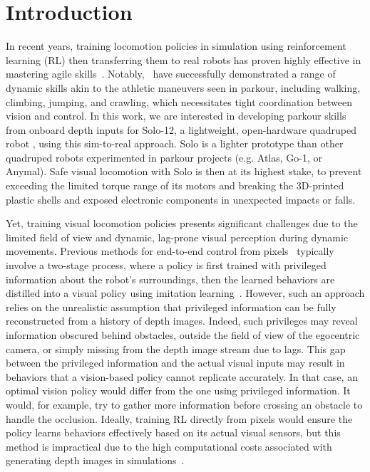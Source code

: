 \section{Introduction}


In recent years, training locomotion policies in simulation using reinforcement learning (RL) then transferring them to real robots has proven highly effective in mastering agile skills~\citep{lee2020learning, bellegarda2020robust, fu2021minimizing,margolis2021learning, rudin2022learning, bellegarda2022robust,li2023robust, he2024agile,inoue2024body, ma2024dreureka}.
Notably,~\citep{caluwaerts2023barkour, zhuang2023robot, cheng2023parkour, hoeller2024anymal} have successfully demonstrated a range of dynamic skills akin to the athletic maneuvers seen in parkour, including walking, climbing, jumping, and crawling, which necessitates tight coordination between vision and control.
In this work, we are interested in developing parkour skills from onboard depth inputs for Solo-12, a lightweight, open-hardware quadruped robot \cite{grimminger2020open}, using this sim-to-real approach. 
Solo is a lighter prototype than other quadruped robots experimented in parkour projects (e.g. Atlas, Go-1, or Anymal). Safe visual locomotion with Solo is then at its highest stake, to prevent exceeding the limited torque range of its motors and breaking the 3D-printed plastic shells and exposed electronic components in unexpected impacts or falls. 

Yet, training visual locomotion policies presents significant challenges due to the limited field of view and dynamic, lag-prone visual perception during dynamic movements.
Previous methods for end-to-end control from pixels~\citep{agarwal2023legged, zhuang2023robot, cheng2023parkour} typically involve a two-stage process,
where a policy is first trained with privileged information about the robot's surroundings, then the learned behaviors are distilled into a visual policy using imitation learning~\citep{ross2011reduction}.
However, such an approach relies on the unrealistic assumption that privileged information can be fully reconstructed from a history of depth images.
Indeed, such privileges may reveal information obscured behind obstacles, outside the field of view of the egocentric camera, or simply missing from the depth image stream due to lags.
This gap between the privileged information and the actual visual inputs may result in behaviors that a vision-based policy cannot replicate accurately.
In that case, an optimal vision policy would differ from the one using privileged information.
It would, for example, try to gather more information before crossing an obstacle to handle the occlusion.
Ideally, training RL directly from pixels would ensure the policy learns behaviors effectively based on its actual visual sensors, but this method is impractical due to the high computational costs associated with generating depth images in simulations~\citep{agarwal2023legged}.

